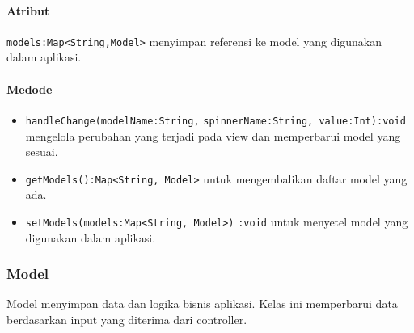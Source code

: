 \documentclass[conference]{IEEEtran}
\begin{document}
\paragraph{Atribut}
\verb |models:Map<String,Model>| menyimpan referensi ke model yang digunakan dalam aplikasi. 
\paragraph{Medode}
\begin{itemize}
\item \verb |handleChange(modelName:String,| \verb |spinnerName:String, value:Int):void| mengelola perubahan yang terjadi pada view dan memperbarui model yang sesuai.
\item \verb |getModels():Map<String, Model>| untuk mengembalikan daftar model yang ada. 
\item \verb |setModels(models:Map<String, Model>)| \verb |:void| untuk menyetel model yang digunakan dalam aplikasi. \\
\end{itemize} 

\subsubsection{Model}
Model menyimpan data dan logika bisnis aplikasi. Kelas ini memperbarui data berdasarkan input yang diterima dari controller. 
\end{document}
